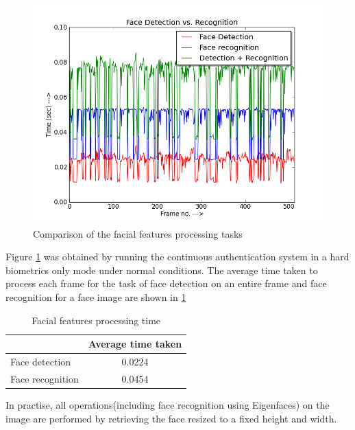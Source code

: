 \documentclass[%
        final,
        notitlepage,
        narroweqnarray,
        inline,
        ]{ieee}
\begin{document}
\begin{figure}[h!]
	\centering
	\includegraphics[scale=0.40]{img/fd_fr_fdfr.png}
	\caption{Comparison of the facial features processing tasks}
	\label{fig:fdfr}
\end{figure}
Figure \ref{fig:fdfr} was obtained by running the continuous authentication system in a hard biometrics only mode under normal conditions. The average time taken to process each frame for the task of face detection on an entire frame and face recognition for a face image are shown in \ref{tab:fdr}

\begin{table}[htp]
	\centering
	\caption{Facial features processing time}
	\begin{tabular}{||l|c||} \hline \hline
			    &  Average time taken \\ \hline
	Face detection      &  0.0224             \\ \hline
	Face recognition    &  0.0454             \\ \hline \hline
	\end{tabular}
	\label{tab:fdr}
\end{table}
In practise, all operations(including face recognition using Eigenfaces) on the image are performed by retrieving the face resized to a fixed height and width.
\end{document}
